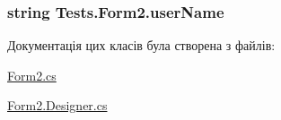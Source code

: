 \subsubsection[{\texorpdfstring{user\+Name}{userName}}]{\setlength{\rightskip}{0pt plus 5cm}string Tests.\+Form2.\+user\+Name\hspace{0.3cm}{\ttfamily [private]}}\hypertarget{class_tests_1_1_form2_a94345348b49022de721b18d56a6ee69c}{}\label{class_tests_1_1_form2_a94345348b49022de721b18d56a6ee69c}


Документація цих класів була створена з файлів\+:\begin{DoxyCompactItemize}
\item 
\hyperlink{_form2_8cs}{Form2.\+cs}\item 
\hyperlink{_form2_8_designer_8cs}{Form2.\+Designer.\+cs}\end{DoxyCompactItemize}
